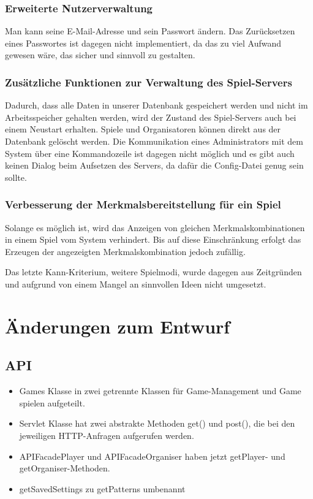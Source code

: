 \documentclass[a4paper]{scrreprt}
\begin{document}
\subsection{Erweiterte Nutzerverwaltung}
Man kann seine E-Mail-Adresse und sein Passwort ändern. Das Zurücksetzen eines Passwortes ist dagegen nicht implementiert, da das zu viel Aufwand gewesen wäre, das sicher und sinnvoll zu gestalten.

\subsection{Zusätzliche Funktionen zur Verwaltung des Spiel-Servers}
Dadurch, dass alle Daten in unserer Datenbank gespeichert werden und nicht im Arbeitsspeicher gehalten werden, wird der Zustand des Spiel-Servers auch bei einem Neustart erhalten. Spiele und Organisatoren können direkt aus der Datenbank gelöscht werden. Die Kommunikation eines Administrators mit dem System über eine Kommandozeile ist dagegen nicht möglich und es gibt auch keinen Dialog beim Aufsetzen des Servers, da dafür die Config-Datei genug sein sollte.

\subsection{Verbesserung der Merkmalsbereitstellung für ein Spiel}
Solange es möglich ist, wird das Anzeigen von gleichen Merkmalskombinationen in einem Spiel vom System verhindert. Bis auf diese Einschränkung erfolgt das Erzeugen der angezeigten Merkmalskombination jedoch zufällig.



\hspace{1cm}

Das letzte Kann-Kriterium, weitere Spielmodi, wurde dagegen aus Zeitgründen und aufgrund von einem Mangel an sinnvollen Ideen nicht umgesetzt.

\chapter{Änderungen zum Entwurf}
\section{API}
\begin{itemize}
    \item Games Klasse in zwei getrennte Klassen für Game-Management und Game spielen aufgeteilt.
    \item Servlet Klasse hat zwei abstrakte Methoden get() und post(), die bei den jeweiligen HTTP-Anfragen aufgerufen werden.
    \item APIFacadePlayer und APIFacadeOrganiser haben jetzt getPlayer- und getOrganiser-Methoden.
    \item getSavedSettings zu getPatterns umbenannt
\end{itemize}
\end{document}

